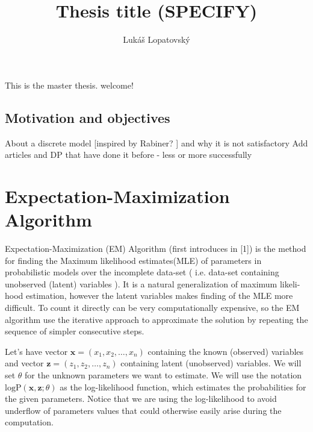 \documentclass[thesis=M,english]{FITthesis}[2012/10/20]
\title{Thesis title (SPECIFY)}
\author{Luk{\' a}{\v s} Lopatovsk{\' y}} %
\begin{document}


\begin{introduction}
	This is the master thesis. welcome!
	\section{Motivation and objectives}
	About a discrete model [inspired by Rabiner? ] and why it is not satisfactory  %
	Add articles and DP that have done it before - less or more successfully 
\end{introduction}



\chapter{Expectation-Maximization Algorithm}\label{ch:EM}



Expectation-Maximization (EM) Algorithm (first introduces in [1]) is the method for finding the Maximum likelihood estimates(MLE) of parameters in probabilistic models over the incomplete data-set ( i.e. data-set containing unobserved (latent) variables ). It is a natural generalization of maximum likeli-
hood estimation, however the latent variables makes finding of the MLE more difficult. To count it directly can be very computationally expensive, so the EM algorithm use the iterative approach to approximate the solution by repeating the sequence of simpler consecutive steps.

Let's have vector $\mathbf{x} = (x_{1},x_{2},\dotsc,x_{n})$ containing the known (observed) variables and vector $\mathbf{z} = (z_{1},z_{2},\dotsc,z_{n})$ containing latent (unobserved) variables. We will set $\theta$ for the unknown parameters we want to estimate. We will use the notation $\mathrm{logP}(\mathbf{x},\mathbf{z};\theta)$ as the log-likelihood function, which estimates the probabilities for the given parameters. Notice that we are using the log-likelihood to avoid underflow of parameters values that could otherwise easily arise during the computation.  
\end{document}
